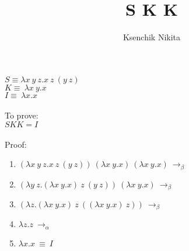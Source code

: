 \documentclass{article}
\title{S K K}
\author{Ksenchik Nikita}
\begin{document}
\maketitle
$S \equiv \lambda x\ y\ z.x\ z\ (y\ z)$\\
$K \equiv \ \lambda x \ y.x$\\
$I \equiv \ \lambda x.x$\\
\\
To prove:\\
$S K K = I$\\ \\
Proof:
\begin{enumerate}
    \item $(\lambda x\ y\ z.x\ z\ (y\ z))\ (\lambda x \ y.x)\ (\lambda x \ y.x)\ \rightarrow_\beta$
    \item $(\lambda y\ z.(\lambda x \ y.x)\ z\ (y\ z))\ (\lambda x \ y.x)\ \rightarrow_\beta$
    \item $(\lambda z.(\lambda x \ y.x)\ z\ ((\lambda x \ y.x)\ z))\ \rightarrow_\beta$
    \item $\lambda z.z\ \rightarrow_\alpha$
    \item $\lambda x.x\ \equiv \ I$ 

\end{enumerate}
\end{document}
